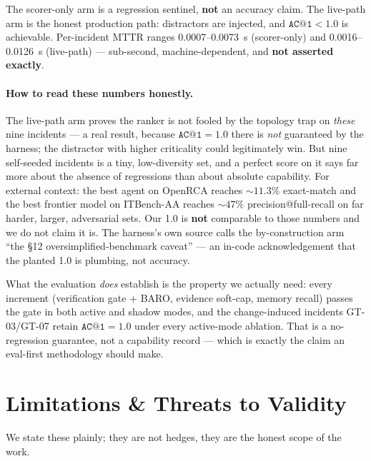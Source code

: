 \documentclass[11pt]{article}
\makeatletter
\newcommand{\acone}{\texttt{AC@1}}
\makeatother
\begin{document}
The scorer-only arm is a regression sentinel, \textbf{not} an accuracy claim. The live-path
arm is the honest production path: distractors are injected, and $\acone{} < 1.0$ is
achievable. Per-incident MTTR ranges 0.0007--0.0073~s (scorer-only) and 0.0016--0.0126~s
(live-path) --- sub-second, machine-dependent, and \textbf{not asserted exactly}.

\paragraph{How to read these numbers honestly.}
The live-path arm proves the ranker is not fooled by the topology trap on \emph{these} nine
incidents --- a real result, because $\acone{} = 1.0$ there is \emph{not} guaranteed by the
harness; the distractor with higher criticality could legitimately win. But nine
self-seeded incidents is a tiny, low-diversity set, and a perfect score on it says far more
about the absence of regressions than about absolute capability. For external context: the
best agent on OpenRCA reaches ${\sim}11.3\%$ exact-match \citep{xu2025openrca} and the best
frontier model on ITBench-AA reaches ${\sim}47\%$ precision@full-recall
\citep{aa2026itbenchaa} on far harder, larger, adversarial sets. Our 1.0 is \textbf{not}
comparable to those numbers and we do not claim it is. The harness's own source calls the
by-construction arm ``the \S12 oversimplified-benchmark caveat'' --- an in-code
acknowledgement that the planted 1.0 is plumbing, not accuracy.

What the evaluation \emph{does} establish is the property we actually need: every increment
(verification gate + BARO, evidence soft-cap, memory recall) passes the gate in both active
and shadow modes, and the change-induced incidents GT-03/GT-07 retain $\acone{} = 1.0$ under
every active-mode ablation. That is a no-regression guarantee, not a capability record ---
which is exactly the claim an eval-first methodology should make.

\section{Limitations \& Threats to Validity}
\label{sec:limitations}

We state these plainly; they are not hedges, they are the honest scope of the work.
\end{document}
